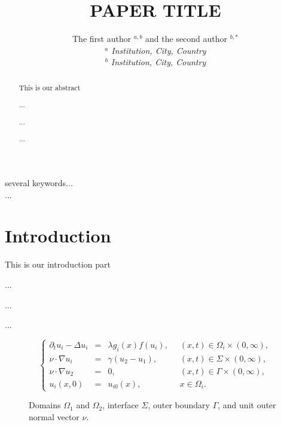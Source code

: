 \documentclass[twoside,10pt]{article}
\numberwithin{equation}{section}
\begin{document}
\title{{\LARGE PAPER TITLE}
 }


\author{{The first author $^{a,b}$ and the second author $^{b,*}$}\\[2mm]
\small\it $^a$ Institution, City, Country \\
\small\it $^b$ Institution, City, Country}


\date{}


\maketitle


\begin{abstract}
This is our abstract

...

...

...
\end{abstract}

 several keywords...\\

 ...


\section{Introduction}
This is our introduction part 

...

...

...


\begin{equation}\label{Intro:1}
\left\{
	\begin{array}{rcll}
		\partial_{t} u_i-\Delta u_i &=& \lambda g_i(x)f(u_i),\;\; & (x,t)\in \Omega_i\times (0,\infty),\\
		\nu\cdot \nabla u_i&=&\gamma (u_2-u_1),& (x,t)\in \Sigma\times (0,\infty),\\
\nu \cdot \nabla u_2 &= &0,\;\; & (x,t)\in \Gamma\times (0,\infty),\\
		u_i(x,0)&=&u_{i0}(x),& x\in \Omega_i.
	\end{array}
	\right.
\end{equation}


\begin{figure}[h]
\caption{Domains $\Omega_1$ and $\Omega_2$, interface $\Sigma$,  outer boundary $\Gamma$, and unit outer normal vector $\nu$.}
\end{figure}
\end{document}
